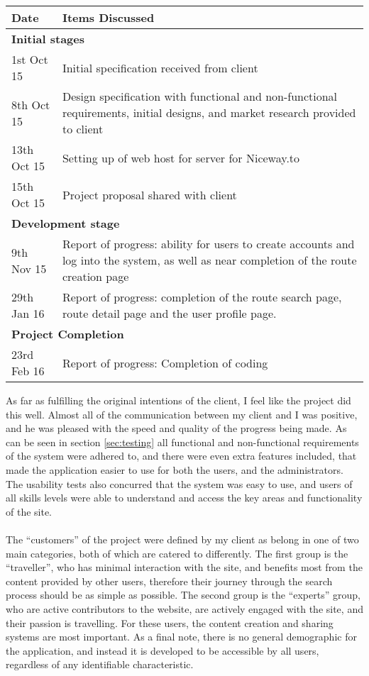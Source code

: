 \begin{center}
\begin{tabular}{p{2cm}|p{12cm}}
	\hline
	\textbf{Date} & \textbf{Items Discussed}\\
	\hline	
	\multicolumn{2}{l}{\textbf{Initial stages}}\\
	\hline
	1st Oct 15 & Initial specification received from client\\
	8th Oct 15 & Design specification with functional and non-functional requirements, initial designs, and market research provided to client\\	
	13th Oct 15 & Setting up of web host for server for Niceway.to \\
	15th Oct 15 & Project proposal shared with client \\
	\hline
	\multicolumn{2}{l}{\textbf{Development stage}}\\
	\hline
	9th Nov 15 & Report of progress: ability for users to create accounts and log into the system, as well as near completion of the route creation page \\
	29th Jan 16 & Report of progress: completion of the route search page, route detail page and the user profile page.\\
	\hline
	\multicolumn{2}{l}{\textbf{Project Completion}}\\	
	\hline		
	23rd Feb 16 & Report of progress: Completion of coding\\
	\hline	
	\end{tabular}	
\end{center}
\noindent 
As far as fulfilling the original intentions of the client, I feel like the project did this well. Almost all of the communication between my client and I was positive, and he was pleased with the speed and quality of the progress being made. As can be seen in section \ref{sec:testing} all functional and non-functional requirements of the system were adhered to, and there were even extra features included, that made the application easier to use for both the users, and the administrators. The usability tests also concurred that the system was easy to use, and users of all skills levels were able to understand and access the key areas and functionality of the site.\ \\
\ \\
The ``customers'' of the project were defined by my client as belong in one of two main categories, both of which are catered to differently. The first group is the ``traveller'', who has minimal interaction with the site, and benefits most from the content provided by other users, therefore their journey through the search process should be as simple as possible. The second group is the ``experts'' group, who are active contributors to the website, are actively engaged with the site, and their passion is travelling. For these users, the content creation and sharing systems are most important. As a final note, there is no general demographic for the application, and instead it is developed to be accessible by all users, regardless of any identifiable characteristic.
